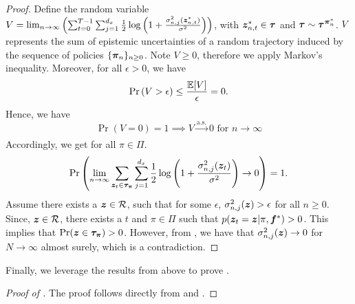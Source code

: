 \begin{proof}
Define the random variable $V = \lim_{n\to \infty} \left(\sum_{t=0}^{T-1} \sum^{d_x}_{j=1}\frac{1}{2} \log \left(1 + \frac{\sigma_{n, j}^2({\bm{z}}^*_{n, t})}{\sigma^2}\right)\right)$, with ${\bm{z}}^*_{n, t} \in {\bm{\tau}}$ and $ {\bm{\tau}} \sim {\bm{\tau}}^{{\bm{\pi}}^*_n}$. $V$ represents the sum of epistemic uncertainties of a random trajectory induced by the sequence of policies $\{{\bm{\pi}}_{n}\}_{n \geq 0}$. Note $V \geq 0$, therefore we apply Markov's inequality. Moreover, for all $\epsilon > 0$, we have
   \begin{equation*}
          \Pr \left(V > \epsilon \right) 
          \leq \frac{\mathbb{E}[V]}{\epsilon} = 0.
   \end{equation*}
   Hence, we have 
   \begin{equation*}
             \Pr \left(V = 0 \right) = 1 \implies V\xrightarrow[]{\mathrm{a.s.}} 0 \text{ for } n \to \infty
\end{equation*}
   Accordingly, we get for all $\pi \in \Pi$. 
   \begin{equation}
       \Pr\left(\lim_{n \to \infty} \sum_{{\bm{z}}_{t} \in {\bm{\tau}}_{{\bm{\pi}}}} \sum^{d_x}_{j=1}\frac{1}{2} \log \left(1 + \frac{\sigma_{n, j}^2({\bm{z}}_{t})}{\sigma^2}\right) \to 0 \right) = 1.
       \label{eq:traj_convergence}
   \end{equation}
   Assume there exists a ${\bm{z}} \in  {\mathcal{R}}$, such that for some $\epsilon$, $\sigma_{n, j}^2({\bm{z}}) > \epsilon$ for all $n \geq 0$. Since, ${\bm{z}} \in {\mathcal{R}}$, there exists a $t$ and $\pi \in \Pi$ such that $p({\bm{z}}_t = {\bm{z}}|\pi, {\bm{f}}^*) > 0$. This implies that $\Pr({\bm{z}} \in {\bm{\tau}}_{{\bm{\pi}}}) > 0$. However, from , we have that $\sigma_{n, j}^2({\bm{z}}) \to 0$ for $N \to \infty$ almost surely, which is a contradiction.
\end{proof}
Finally, we leverage the results from above to prove .
\begin{proof}[Proof of ]
    The proof follows directly from  and .
\end{proof}


